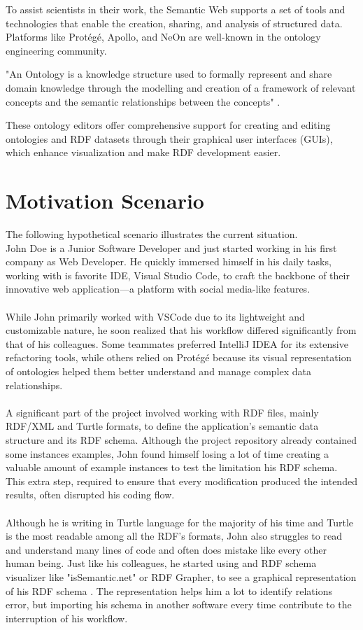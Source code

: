 To assist scientists in their work, the Semantic Web supports a set of tools and technologies that enable the creation, sharing, and analysis of structured data.
Platforms like Protégé, Apollo, and NeOn are well-known in the ontology engineering community. 

"An Ontology is a knowledge structure used to formally represent and share domain knowledge through the modelling and creation of a framework of relevant concepts and the semantic relationships between the concepts" \cite{ontology}.

These ontology editors offer comprehensive support for creating and editing ontologies and RDF datasets through their graphical user interfaces (GUIs), which enhance visualization and make RDF development easier.

\section{Motivation Scenario\label{sec:moti}}

The following hypothetical scenario illustrates the current situation.
\\
John Doe is a Junior Software Developer and just started working in his first company as Web Developer.
He quickly immersed himself in his daily tasks, working with is favorite IDE, Visual Studio Code, to craft the backbone of their innovative web application—a platform with social media-like features. 
\\
\\
While John primarily worked with VSCode due to its lightweight and customizable nature, he soon realized that his workflow differed significantly from that of his colleagues. Some teammates preferred IntelliJ IDEA for its extensive refactoring tools, while others relied on Protégé because its visual representation of ontologies helped them better understand and manage complex data relationships.
\\
\\
A significant part of the project involved working with RDF files, mainly RDF/XML and Turtle formats, to define the application's semantic data structure and its RDF schema. Although the project repository already contained some instances examples, John found himself losing a lot of time creating a valuable amount of example instances to test the limitation his RDF schema. This extra step, required to ensure that every modification produced the intended results, often disrupted his coding flow.
\\
\\
Although he is writing in Turtle language for the majority of his time and Turtle is the most readable among all the RDF's formats, John also struggles to read and understand many lines of code and often does mistake like every other human being. Just like his colleagues, he started using and RDF schema visualizer like "isSemantic.net" or RDF Grapher, to see a graphical representation of his RDF schema \cite{issemantic,rdfGrapher}. The representation helps him a lot to identify relations error, but importing his schema in another software every time contribute to the interruption of his workflow.



